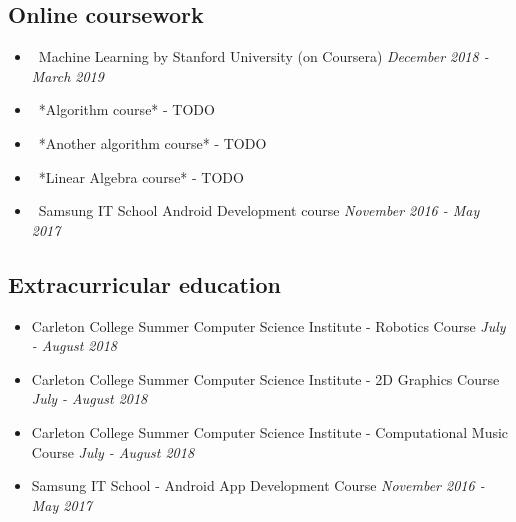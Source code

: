 \documentclass[letter,10pt]{extarticle}
\begin{document}
\subsection*{Online coursework}
\vspace{-0.5em}
\begin{itemize}
    \vspace{-0.3em}
    \item\ Machine Learning by Stanford University (on Coursera)
    \hfill\emph{December 2018 - March 2019}
    \vspace{-0.5em}
    \item\ *Algorithm course* - TODO
    \vspace{-0.5em}
    \item\ *Another algorithm course* - TODO
    \vspace{-0.5em}
    \item\ *Linear Algebra course* - TODO
    \vspace{-0.5em}
    \item\ Samsung IT School Android Development course
    \hfill {\emph{November 2016 - May 2017}}
\end{itemize}
\vspace{-2em}
\subsection*{Extracurricular education}
\vspace{-0.5em}
\begin{itemize}
    \item Carleton College Summer Computer Science Institute - Robotics Course
    \hfill\emph{July - August 2018}
    \vspace{-0.5em}
    \item Carleton College Summer Computer Science Institute - 2D Graphics Course
    \hfill\emph{July - August 2018}
    \vspace{-0.5em}
    \item Carleton College Summer Computer Science Institute - Computational Music Course
    \hfill\emph{July - August 2018}
    \vspace{-0.5em}
    \item Samsung IT School - Android App Development Course
    \hfill \emph{November 2016 - May 2017}
\end{itemize}
\vspace{-2em}
\end{document}
